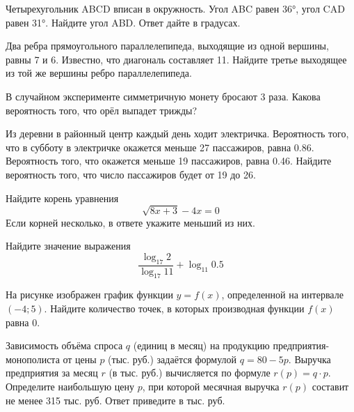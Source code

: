 



\cleardoublepage
\def\examvart{Вариант 14.2}
\normalsize

\startpartone
\large




\begin{taskBN}{1}
Четырехугольник ABCD вписан в окружность. Угол ABC равен 36°, угол CAD равен 31°. Найдите угол ABD. Ответ дайте в градусах.
\end{taskBN}

\begin{taskBN}{2}
Два ребра прямоугольного параллелепипеда, выходящие из одной вершины, равны 7 и 6. Известно, что диагональ составляет 11. Найдите третье выходящее из той же вершины ребро параллелепипеда.
\end{taskBN}

\begin{taskBN}{3}
В случайном эксперименте симметричную монету бросают 3 раза. Какова вероятность того, что орёл выпадет трижды?
\end{taskBN}

\begin{taskBN}{4}
Из деревни в районный центр каждый день ходит электричка. Вероятность того, что в субботу в электричке окажется меньше 27 пассажиров, равна 0.86. Вероятность того, что окажется меньше 19 пассажиров, равна 0.46. Найдите вероятность того, что число пассажиров будет от 19 до 26.
\end{taskBN}

\begin{taskBN}{5}
Найдите корень уравнения $$\sqrt{8x+3}-4x=0$$ Если корней несколько, в ответе укажите меньший из них.
\end{taskBN}

\begin{taskBN}{6}
Найдите значение выражения $$\frac{\log_{17}{2}}{\log_{17}{11}}+\log_{11}{0.5}$$
\end{taskBN}

\begin{taskBN}{7}
На рисунке изображен график функции $y = f(x)$, определенной на интервале $(-4; 5)$. Найдите количество точек, в которых производная функции $f(x)$ равна $0$.
\end{taskBN}

\begin{taskBN}{8}
Зависимость объёма спроса $q$ (единиц в месяц) на продукцию предприятия-монополиста от цены $p$ (тыс. руб.) задаётся формулой $q=80-5p$. Выручка предприятия за месяц $r$ (в тыс. руб.) вычисляется по формуле $r(p)=q\cdot p$. Определите наибольшую цену $p$, при которой месячная выручка $r(p)$ составит не менее 315 тыс. руб. Ответ приведите в тыс. руб.
\end{taskBN}


